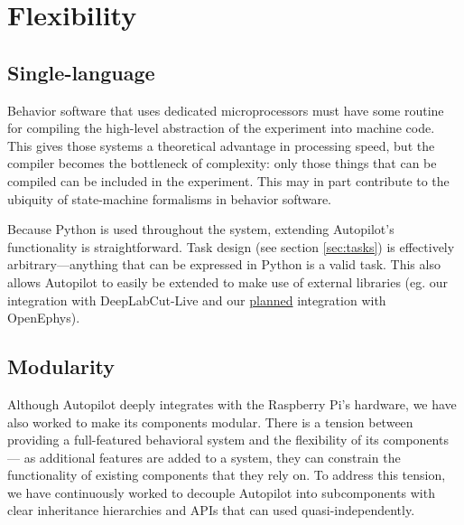 \section{Flexibility}
\label{sec:flexibility}

\subsection{Single-language}
\label{sec:singlelanguage}

Behavior software that uses dedicated microprocessors must have some routine for compiling the high-level abstraction of the experiment into machine code. This gives those systems a theoretical advantage in processing speed, but the compiler becomes the bottleneck of complexity: only those things that can be compiled can be included in the experiment. This may in part contribute to the ubiquity of state-machine formalisms in behavior software.

Because Python is used throughout the system, extending Autopilot's functionality is straightforward. Task design (see section \hyperref[sec:tasks]{\ref*{sec:tasks}}) is effectively arbitrary---anything that can be expressed in Python is a valid task. This also allows Autopilot to easily be extended to make use of external libraries (eg. our integration with DeepLabCut-Live\citep{kaneRealtimeLowlatencyClosedloop2020a} and our \hyperref[item:othertools]{planned} integration with OpenEphys).

\subsection{Modularity}

Although Autopilot deeply integrates with the Raspberry Pi's hardware, we have also worked to make its components modular. There is a tension between providing a full-featured behavioral system and the flexibility of its components --- as additional features are added to a system, they can constrain the functionality of existing components that they rely on. To address this tension, we have continuously worked to decouple Autopilot into subcomponents with clear inheritance hierarchies and APIs that can used quasi-independently. 

